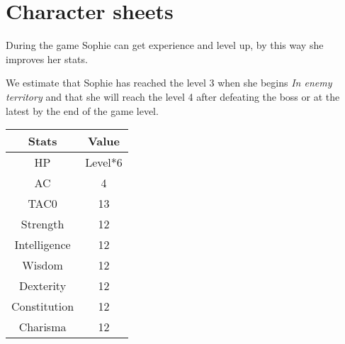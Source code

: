 \section{Character sheets}
During the game Sophie can get experience and level up, by this way she improves her stats.

We estimate that Sophie has reached the level 3 when she begins \textit{In enemy territory} and that she will reach the level 4 after defeating the boss or at the latest by the end of the game level.
\begin{table}[H]
  \centering
  \begin{tabular}{|c|c|}
    \hline
    \rowcolor[HTML]{C0C0C0}
    \textbf{Stats} & \textbf{Value} \\ \hline
    HP & Level*6 \\ \hline
    AC & 4 \\ \hline
    TAC0 & 13 \\ \hline
    Strength & 12 \\ \hline
    Intelligence & 12 \\ \hline
    Wisdom & 12  \\ \hline
    Dexterity & 12 \\ \hline
    Constitution & 12  \\ \hline
    Charisma & 12 \\ \hline
  \end{tabular}
\end{table}
